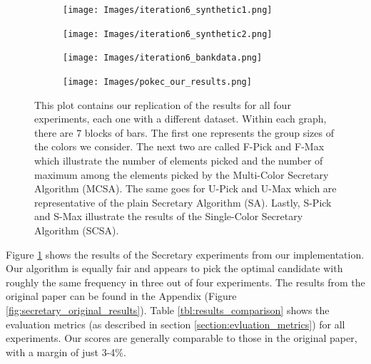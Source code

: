 \begin{figure}[h!]
  \begin{minipage}{\linewidth}
      \centering
      \begin{minipage}{0.45\linewidth}
          \begin{figure}[H]
              \texttt{[image: Images/iteration6\_synthetic1.png]}
          \end{figure}
      \end{minipage}
      \begin{minipage}{0.45\linewidth}
          \begin{figure}[H]
              \texttt{[image: Images/iteration6\_synthetic2.png]}
          \end{figure}
      \end{minipage}
      \begin{minipage}{0.45\linewidth}
          \begin{figure}[H]
              \texttt{[image: Images/iteration6\_bankdata.png]}
          \end{figure}
      \end{minipage}
      \begin{minipage}{0.45\linewidth}
          \begin{figure}[H]
              \texttt{[image: Images/pokec\_our\_results.png]}
          \end{figure}
      \end{minipage}
  \end{minipage}
  \caption{This plot contains our replication of the results for all four experiments, each one with a different dataset. Within each graph, there are 7 blocks of bars. The first one represents the group sizes of the colors we consider. The next two are called F-Pick and F-Max which illustrate the number of elements picked and the number of maximum among the elements picked by the Multi-Color Secretary Algorithm (MCSA). The same goes for U-Pick and U-Max which are representative of the plain Secretary Algorithm (SA). Lastly, S-Pick and S-Max illustrate the results of the Single-Color Secretary Algorithm (SCSA).}
  \label{fig:secretary_results}
\end{figure}

Figure \ref{fig:secretary_results} shows the results of the Secretary experiments from our implementation. Our algorithm is equally fair and appears to pick the optimal candidate with roughly the same frequency in three out of four experiments. The results from the original paper can be found in the Appendix (Figure \ref{fig:secretary_original_results}). Table \ref{tbl:results_comparison} shows the evaluation metrics (as described in section \ref{section:evluation_metrics})  for all experiments. Our scores are generally comparable to those in the original paper, with a margin of just 3-4\%.


